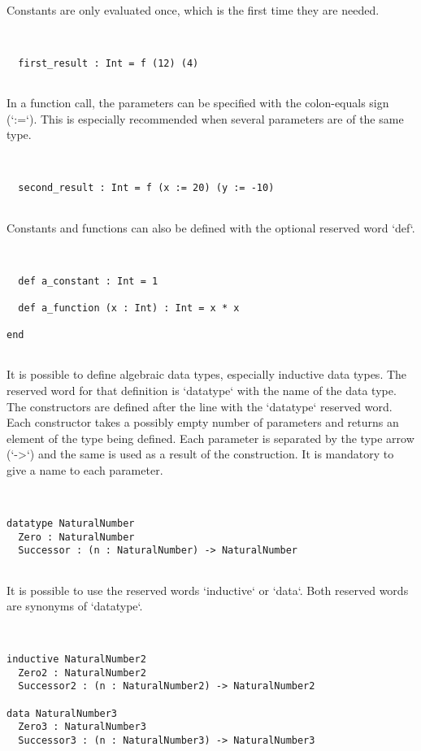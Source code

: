 \documentclass[12pt,a4paper]{article}
\begin{document}
  Constants are only evaluated once, which is the first time they are needed.


\begin{lstlisting}


  first_result : Int = f (12) (4)


\end{lstlisting}

  In a function call, the parameters can be specified with the colon-equals sign (`:=`).
   This is especially recommended when several parameters are of the same type.


\begin{lstlisting}


  second_result : Int = f (x := 20) (y := -10)


\end{lstlisting}

  Constants and functions can also be defined with the optional reserved word `def`.


\begin{lstlisting}


  def a_constant : Int = 1

  def a_function (x : Int) : Int = x * x

end


\end{lstlisting}

It is possible to define algebraic data types, especially inductive data types.
 The reserved word for that definition is `datatype` with the name of the data type.
 The constructors are defined after the line with the `datatype` reserved word.
 Each constructor takes a possibly empty number of parameters and returns an element of the type being defined.
 Each parameter is separated by the type arrow (`->`) and the same is used as a result of the construction.
 It is mandatory to give a name to each parameter.



\begin{lstlisting}


datatype NaturalNumber
  Zero : NaturalNumber
  Successor : (n : NaturalNumber) -> NaturalNumber


\end{lstlisting}

It is possible to use the reserved words `inductive` or `data`. Both reserved words are
 synonyms of `datatype`.


\begin{lstlisting}


inductive NaturalNumber2
  Zero2 : NaturalNumber2
  Successor2 : (n : NaturalNumber2) -> NaturalNumber2

data NaturalNumber3
  Zero3 : NaturalNumber3
  Successor3 : (n : NaturalNumber3) -> NaturalNumber3


\end{lstlisting}
\end{document}
